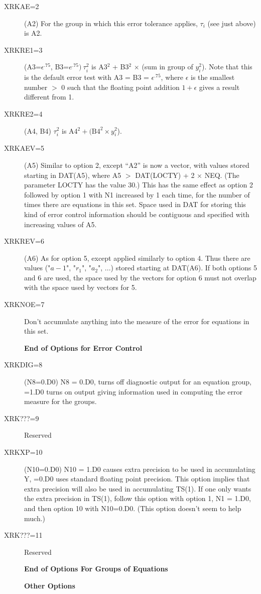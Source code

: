 \documentclass[twoside]{MATH77}
\begin{document}
\begin{description}
\item[XRKAE=2] (A2) For the group in which this error tolerance applies,
   $\tau_i$ (see just above) is A2.
\item[XRKRE1=3] (A3=$\epsilon ^{.75}$, B3=$e^{.75})\ \tau_i^2$ is
A3$^2$ + B3$^2$ $\times$ (sum in group of $y_i^2$).  Note that this is
the default error test with A3 = B3 = $\epsilon ^{.75}$, where $\epsilon$
is the smallest number $>$ 0 such that the floating point addition $1 +
\epsilon$ gives a result different from 1.
\item[XRKRE2=4] (A4, B4)  $\tau_i^2$ is A4$^2 + (\text{B4}^2 \times
y_i^2$).
\item[XRKAEV=5] (A5) Similar to option 2, except ``A2'' is now a
  vector, with values stored starting in DAT(A5), where A5 $>$
  DAT(LOCTY) + 2 $\times $ NEQ.  (The parameter LOCTY has the value
  30.) This has the same effect as option 2 followed by option 1 with
  N1 increased by 1 each time, for the number of times there are
  equations in this set.  Space used in DAT for storing this kind of
  error control information should be contiguous and specified with
  increasing values of A5.
\item[XRKREV=6] (A6) As for option 5, except applied similarly to option
4. Thus there are values ("$a-1$", "$r_1$", "$a_2$", ...) stored starting at
DAT(A6).  If both options 5 and 6 are used, the space used by the vectors
for option 6 must not overlap with the space used by vectors for 5.
\item[XRKNOE=7] Don't accumulate anything into the measure of the error for
   equations in this set.
\item[ ] {\bf End of Options for Error Control}
\item[XRKDIG=8] (N8=0.D0) N8 = 0.D0, turns off diagnostic output for an
   equation group, =1.D0 turns on output giving information used in
   computing the error measure for the groups.
\item[XRK???=9] Reserved
\item[XRKXP=10] (N10=0.D0) N10 = 1.D0 causes extra precision to be used in
   accumulating Y, =0.D0 uses standard floating point precision.
   This option implies that extra precision will also be used in
   accumulating TS(1).  If one only wants the extra precision in
   TS(1), follow this option with option 1, N1 = 1.D0, and then
   option 10 with N10=0.D0.  (This option doesn't seem to help much.)
\item[XRK???=11] Reserved
\item[ ] {\bf \hspace{-10pt} End of Options For Groups of Equations}
\item[ ] {\bf \hspace{-10pt} Other Options}


\end{description}
\end{document}
